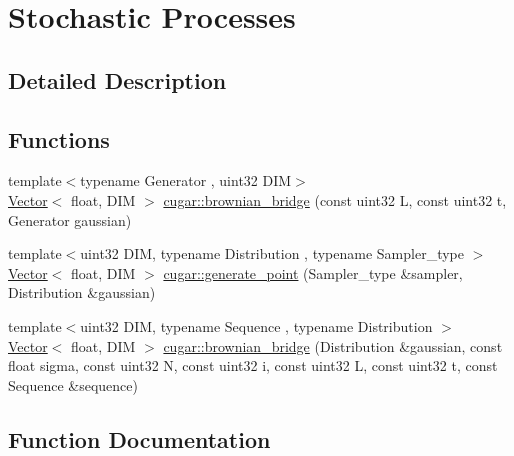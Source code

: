 \hypertarget{group__processes}{}\section{Stochastic Processes}
\label{group__processes}


\subsection{Detailed Description}
\subsection*{Functions}
\begin{DoxyCompactItemize}
\item 
{\footnotesize template$<$typename Generator , uint32 D\+IM$>$ }\\\hyperlink{structcugar_1_1_vector}{Vector}$<$ float, D\+IM $>$ \hyperlink{group__processes_ga5c4e54da1f4419033a8ae7f5aa8cdbb2}{cugar\+::brownian\+\_\+bridge} (const uint32 L, const uint32 t, Generator gaussian)
\item 
{\footnotesize template$<$uint32 D\+IM, typename Distribution , typename Sampler\+\_\+type $>$ }\\\hyperlink{structcugar_1_1_vector}{Vector}$<$ float, D\+IM $>$ \hyperlink{group__processes_ga9f3fe90d8a07d266c41f239963b83644}{cugar\+::generate\+\_\+point} (Sampler\+\_\+type \&sampler, Distribution \&gaussian)
\item 
{\footnotesize template$<$uint32 D\+IM, typename Sequence , typename Distribution $>$ }\\\hyperlink{structcugar_1_1_vector}{Vector}$<$ float, D\+IM $>$ \hyperlink{group__processes_ga804d942e70bf4d755991fc3393004e8e}{cugar\+::brownian\+\_\+bridge} (Distribution \&gaussian, const float sigma, const uint32 N, const uint32 i, const uint32 L, const uint32 t, const Sequence \&sequence)
\end{DoxyCompactItemize}


\subsection{Function Documentation}
\mbox{\label{group__processes_ga5c4e54da1f4419033a8ae7f5aa8cdbb2}} 
